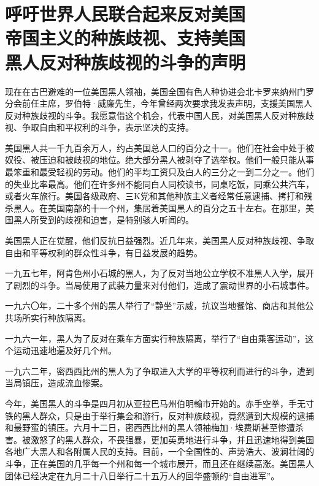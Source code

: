\section[呼吁世界人民联合起来反对美国帝国主义的种族歧视、支持美国黑人反对种族歧视的斗争的声明（一九六三年八月八日）]{呼吁世界人民联合起来反对美国\\帝国主义的种族歧视、支持美国\\黑人反对种族歧视的斗争的声明}


现在在古巴避难的一位美国黑人领袖，美国全国有色人种协进会北卡罗来纳州门罗分会前任主席，罗伯特·威廉先生，今年曾经两次要求我发表声明，支援美国黑人反对种族歧视的斗争。我愿意借这个机会，代表中国人民，对美国黑人反对种族歧视、争取自由和平权利的斗争，表示坚决的支持。

美国黑人共一千九百余万人，约占美国总人口的百分之十一。他们在社会中处于被奴役、被压迫和被歧视的地位。绝大部分黑人被剥夺了选举权。他们一般只能从事最笨重和最受轻视的劳动。他们的平均工资只及白人的三分之一到二分之一。他们的失业比率最高。他们在许多州不能同白人同校读书，同桌吃饭，同乘公共汽车，或者火车旅行。美国各级政府、三K党和其他种族主义者经常任意逮捕、拷打和残杀黑人。在美国南部的十一个州，集居着美国黑人的百分之五十左右。在那里，美国黑人所受到的歧视和迫害，是特别骇人听闻的。

美国黑人正在觉醒，他们反抗日益强烈。近几年来，美国黑人反对种族歧视、争取自由和平等权利的群众性斗争，有日益发展的趋势。

一九五七年，阿肯色州小石城的黑人，为了反对当地公立学校不准黑人入学，展开了剧烈的斗争。当局使用了武装力量来对付他们，造成了震动世界的小石城事件。

一九六〇年，二十多个州的黑人举行了“静坐”示威，抗议当地餐馆、商店和其他公共场所实行种族隔离。

一九六一年，黑人为了反对在乘车方面实行种族隔离，举行了“自由乘客运动”，这个运动迅速地遍及好几个州。

一九六二年，密西西比州的黑人为了争取进入大学的平等权利而进行的斗争，遭到当局镇压，造成流血惨案。

今年，美国黑人的斗争是四月初从亚拉巴马州伯明翰市开始的。赤手空拳，手无寸铁的黑人群众，只是由于举行集会和游行，反对种族歧视，竟然遭到大规模的逮捕和最野蛮的镇压。六月十二日，密西西比州的黑人领袖梅加·埃费斯甚至惨遭杀害。被激怒了的黑人群众，不畏强暴，更加英勇地进行斗争，并且迅速地得到美国各地广大黑人和各附属人民的支持。目前，一个全国性的、声势浩大、波澜壮阔的斗争，正在美国的几乎每一个州和每一个城市展开，而且还在继续高涨。美国黑人团体已经决定在九月二十八日举行二十五万人的回华盛顿的“自由进军”。

